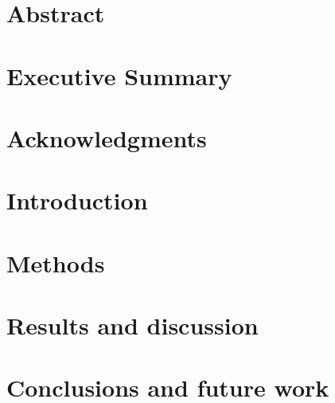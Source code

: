 \documentclass[12pt, oneside]{book}
\begin{document}
\chapter{Abstract}

\chapter{Executive Summary}


\chapter{Acknowledgments}


\tableofcontents

\listoffigures

\mainmatter

\chapter{Introduction}


\chapter{Methods}


\chapter{Results and discussion}


\chapter{Conclusions and future work}

\end{document}
